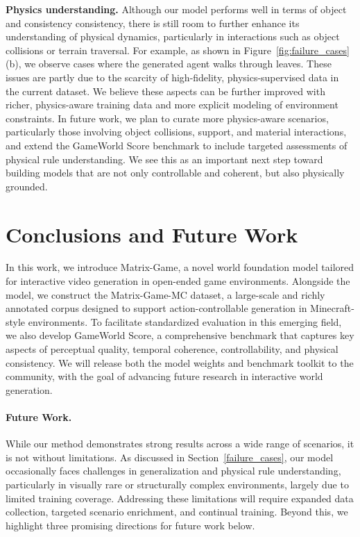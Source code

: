 \documentclass{article}
\begin{document}
\textbf{Physics understanding.}
Although our model performs well in terms of object and consistency consistency, there is still room to further enhance its understanding of physical dynamics, particularly in interactions such as object collisions or terrain traversal.  For example, as shown in Figure~\ref{fig:failure_cases}(b), we observe cases where the generated agent walks through leaves. These issues are partly due to the scarcity of high-fidelity, physics-supervised data in the current dataset. We believe these aspects can be further improved with richer, physics-aware training data and more explicit modeling of environment constraints. In future work, we plan to curate more physics-aware scenarios, particularly those involving object collisions, support, and material interactions, and extend the {GameWorld Score} benchmark to include targeted assessments of physical rule understanding. We see this as an important next step toward building models that are not only controllable and coherent, but also physically grounded.



\section{Conclusions and Future Work}

In this work, we introduce Matrix-Game, a novel world foundation model tailored for interactive video generation in open-ended game environments. Alongside the model, we construct the Matrix-Game-MC dataset, a large-scale and richly annotated corpus designed to support action-controllable generation in Minecraft-style environments. To facilitate standardized evaluation in this emerging field, we also develop GameWorld Score, a comprehensive benchmark that captures key aspects of perceptual quality, temporal coherence, controllability, and physical consistency. We will release both the model weights and benchmark toolkit to the community, with the goal of advancing future research in interactive world generation.


\paragraph{Future Work.} While our method demonstrates strong results across a wide range of scenarios, it is not without limitations. As discussed in Section~\ref{failure_cases}, our model occasionally faces challenges in generalization and physical rule understanding, particularly in visually rare or structurally complex environments, largely due to limited training coverage. Addressing these limitations will require expanded data collection, targeted scenario enrichment, and continual training. Beyond this, we highlight three promising directions for future work below.
\end{document}
